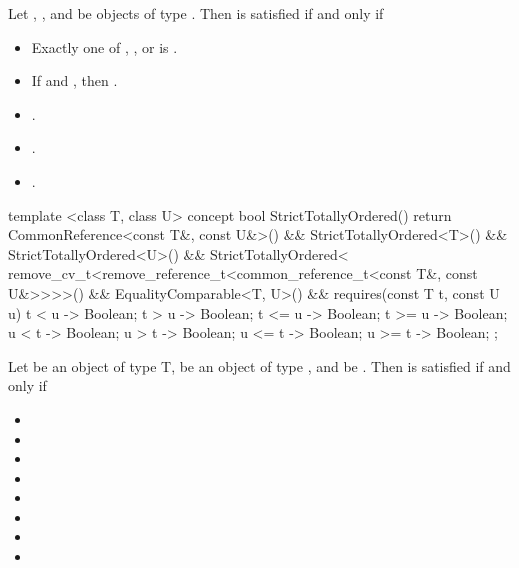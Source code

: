 \begin{itemdescr}
\pnum
Let , , and  be objects of type .
Then  is satisfied if and only if

\begin{itemize}
\item Exactly one of , , or
       is .
\item If  and , then
      .
\item {}.
\item {}.
\item {}.
\end{itemize}

\end{itemdescr}

\begin{itemdecl}
template <class T, class U>
concept bool StrictTotallyOrdered() {
  return CommonReference<const T&, const U&>() &&
    StrictTotallyOrdered<T>() &&
    StrictTotallyOrdered<U>() &&
    StrictTotallyOrdered<
      remove_cv_t<remove_reference_t<common_reference_t<const T&, const U&>>>>() &&
    EqualityComparable<T, U>() &&
    requires(const T t, const U u) {
      { t < u } -> Boolean;
      { t > u } -> Boolean;
      { t <= u } -> Boolean;
      { t >= u } -> Boolean;
      { u < t } -> Boolean;
      { u > t } -> Boolean;
      { u <= t } -> Boolean;
      { u >= t } -> Boolean;
    };
}
\end{itemdecl}

\begin{itemdescr}
\pnum
Let  be an object of type T,  be an object
of type , and  be
.
Then  is satisfied if and only if

\begin{itemize}
\item {}
\item {}
\item {}
\item {}
\item {}
\item {}
\item {}
\item {}
\end{itemize}
\end{itemdescr}

